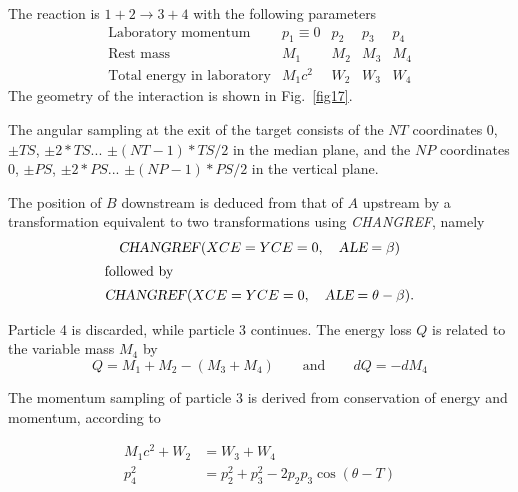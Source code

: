  The reaction is $ 1+2 \longrightarrow  3+4 $ with the following parameters 
$$
\begin{array}{lllll}
	\text{Laboratory momentum} & p_1\equiv  0 &  p_2 &   p_3 &    p_4 \\
	\text{Rest mass}           &   M_1        &   M_2 & M_3 &    M_4 \\ 
	\text{Total energy in laboratory} & M_1c^2 &  W_2 &    W_3 &   W_4 
\end{array}
$$
%
 The geometry of the interaction is shown in Fig.~\ref{fig17}.   
\medskip

\noindent The angular  sampling at the exit of the target consists of the $ NT$ 
coordinates 0,  $ \pm TS$,  $ \pm 2\ast TS$...   $\pm (NT-1)\ast TS/2 $ 
in the median plane, 
and the $ NP $ coordinates 0, $ \pm PS$,  $ \pm 2\ast PS$... $ \pm (NP-1)\ast PS/2$ 
in the vertical plane.  
\medskip

\noindent The position of $ B $ downstream is deduced from that of $ A $
upstream  by a transformation equivalent to two transformations using \textsl{CHANGREF},
 namely
 \begin{gather*}
	 \text{\textsl{CHANGREF}}(XCE=YCE=0,\quad  \textsl{ALE}=\beta )  \\
\intertext{followed by} 
	 \text{\textsl{CHANGREF}}(XCE=YCE=0,\quad \textsl{ALE}=\theta -\beta ). 
 \end{gather*}

 
\noindent Particle  4 is discarded, while particle 3 continues. The energy
loss $ Q $ is related to the variable mass $ M_4 $ by
$$ Q=M_1+M_2-(M_3+M_4)\qquad \text{and} \qquad dQ=-dM_4 $$

\noindent The momentum sampling of particle 3 is derived from conservation of
energy and 
momentum, according to 

\begin{align*}
	M_1c^2+W_2 & =  W_3+W_4  \\
	p^2_4 & =  p^2_2 +p^2_3 -2p_2p_3 \cos (\theta -T) 
\end{align*}


